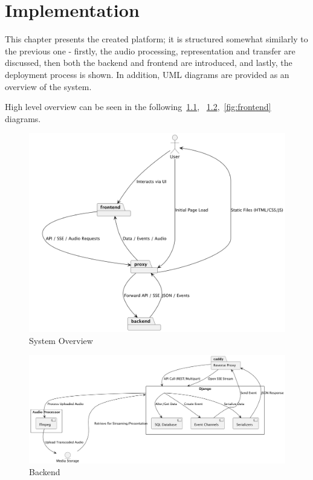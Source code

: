 \usepackage{hyperref}


\chapter{Implementation}\label{ch:implementation}

This chapter presents the created platform; it is structured somewhat similarly to the previous one - firstly, the
audio processing, representation and transfer are discussed, then both the backend and frontend are introduced,
and lastly, the deployment process is shown.
In addition, UML diagrams are provided as an overview of the system.

High level overview can be seen in the following~\ref{fig:system_overview},
~\ref{fig:backend},~\ref{fig:frontend} diagrams.

\begin{figure}[htbp]
    \centering
    \includegraphics[width=1\textwidth, keepaspectratio]{diagrams/system.png}
    \caption{System Overview}
    \label{fig:system_overview}
\end{figure}

\begin{figure}[htbp]
    \centering
    \includegraphics[width=1\textwidth, keepaspectratio]{diagrams/backend.png}
    \caption{Backend}
    \label{fig:backend}
\end{figure}

